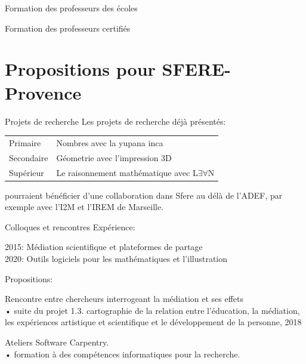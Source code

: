 \documentclass[
  french,
  ignorenonframetext,
]{beamer}
\begin{document}
\begin{frame}{Formation des professeurs des écoles}
\protect\hypertarget{formation-des-professeurs-des-uxe9coles}{}
\end{frame}

\begin{frame}{Formation des professeurs certifiés}
\protect\hypertarget{formation-des-professeurs-certifiuxe9s}{}
\end{frame}

\hypertarget{propositions-pour-sfere-provence}{%
\section{Propositions pour
SFERE-Provence}\label{propositions-pour-sfere-provence}}

\begin{frame}{Projets de recherche}
\protect\hypertarget{projets-de-recherche}{}
Les projets de recherche déjà présentés:

\begin{longtable}[]{@{}ll@{}}
\toprule
\endhead
Primaire & Nombres avec la yupana inca\tabularnewline
Secondaire & Géometrie avec l'impression 3D\tabularnewline
Supérieur & Le raisonnement mathématique avec L\(∃∀\)N\tabularnewline
\bottomrule
\end{longtable}

pourraient bénéficier d'une collaboration dans Sfere au délà de l'ADEF,
par exemple avec l'I2M et l'IREM de Marseille.
\end{frame}

\begin{frame}{Colloques et rencontres}
\protect\hypertarget{colloques-et-rencontres}{}
Expérience:

2015: Médiation scientifique et plateformes de partage\\
2020: Outils logiciels pour les mathématiques et l'illustration

Propositions:

Rencontre entre chercheurs interrogeant la médiation et ses effets\\
• suite du projet 1.3. cartographie de la relation entre l'éducation, la
médiation, les expériences artistique et scientifique et le
développement de la personne, 2018

Ateliers Software Carpentry.\\
• formation à des compétences informatiques pour la recherche.
\end{frame}
\end{document}
